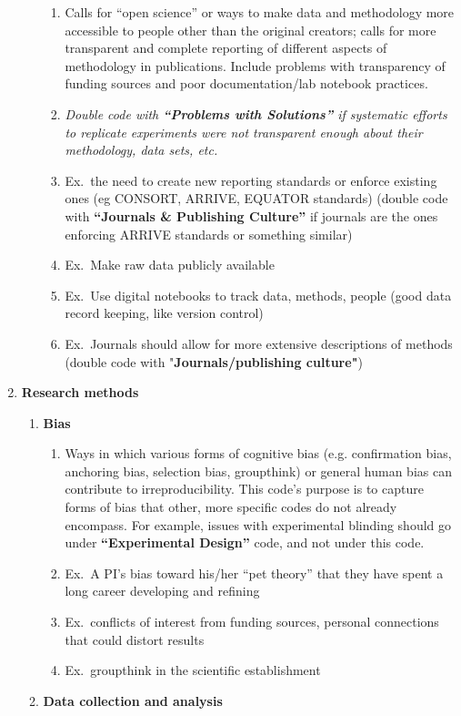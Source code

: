 \documentclass[
]{scrartcl}
\begin{document}
\begin{enumerate}
\begin{enumerate}
    \begin{enumerate}
    
    \item
      Calls for ``open science'' or ways to make data and methodology
      more accessible to people other than the original creators; calls
      for more transparent and complete reporting of different aspects
      of methodology in publications. Include problems with transparency
      of funding sources and poor documentation/lab notebook practices.
    \item
      \emph{Double code with \textbf{``Problems with Solutions''} if
      systematic efforts to replicate experiments were not transparent
      enough about their methodology, data sets, etc.}
    \item
      Ex.~the need to create new reporting standards or enforce existing
      ones (eg CONSORT, ARRIVE, EQUATOR standards) (double code with
      \textbf{``Journals \& Publishing Culture''} if journals are the
      ones enforcing ARRIVE standards or something similar)
    \item
      Ex.~Make raw data publicly available
    \item
      Ex.~Use digital notebooks to track data, methods, people (good
      data record keeping, like version control)
    \item
      Ex.~Journals should allow for more extensive descriptions of
      methods (double code with "\textbf{Journals/publishing culture"})
    \end{enumerate}
  \end{enumerate}
\item
  \textbf{Research methods}

  \begin{enumerate}

  \item
    \textbf{Bias}

    \begin{enumerate}
    
    \item
      Ways in which various forms of cognitive bias (e.g. confirmation
      bias, anchoring bias, selection bias, groupthink) or general human
      bias can contribute to irreproducibility. This code's purpose is
      to capture forms of bias that other, more specific codes do not
      already encompass. For example, issues with experimental blinding
      should go under \textbf{``Experimental Design''} code, and not
      under this code.
    \item
      Ex.~A PI's bias toward his/her ``pet theory'' that they have spent
      a long career developing and refining
    \item
      Ex.~conflicts of interest from funding sources, personal
      connections that could distort results
    \item
      Ex.~groupthink in the scientific establishment
    \end{enumerate}
  \item
    \textbf{Data collection and analysis}


\end{enumerate}
\end{enumerate}
\end{document}
